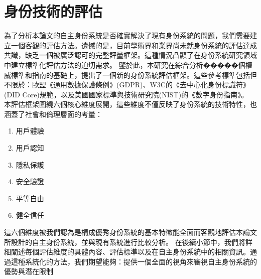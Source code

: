 \section{身份技術的評估}
為了分析本論文的自主身份系統是否確實解決了現有身份系統的問題，我們需要建立一個客觀的評估方法。遺憾的是，目前學術界和業界尚未就身份系統的評估達成共識，缺乏一個被廣泛認可的完整評量框架。這種情況凸顯了在身份系統研究領域中建立標準化評估方法的迫切需求。\newline
鑒於此，本研究在綜合分析�����個權威標準和指南的基礎上，提出了一個新的身份系統評估框架。這些參考標準包括但不限於：歐盟《通用數據保護條例》(GDPR)\cite{GDPR2016}、W3C的《去中心化身份標識符》(DID Core)規範\cite{DIDCore}，以及美國國家標準與技術研究院(NIST)的《數字身份指南》\cite{NIST800-63-3}。\newline
本評估框架圍繞六個核心維度展開，這些維度不僅反映了身份系統的技術特性，也涵蓋了社會和倫理層面的考量：
\begin{enumerate}
  \item 用戶體驗
  \item 用戶認知
  \item 隱私保護
  \item 安全驗證
  \item 平等自由
  \item 健全信任
\end{enumerate}
這六個維度被我們認為是構成優秀身份系統的基本特徵能全面而客觀地評估本論文所設計的自主身份系統，並與現有系統進行比較分析。\newline
在後續小節中，我們將詳細闡述每個評估維度的具體內容、評估標準以及在自主身份系統中的相關資訊。通過這種系統化的方法，我們期望能夠：提供一個全面的視角來審視自主身份系統的優勢與潛在限制
